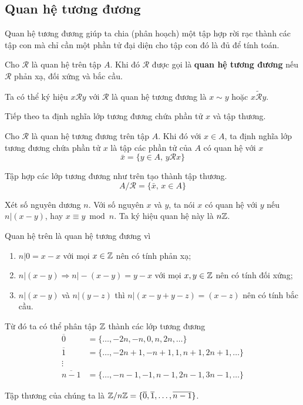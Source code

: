 \subsection*{Quan hệ tương đương}

Quan hệ tương đương giúp ta chia (phân hoạch) một tập hợp rời rạc thành các tập con mà chỉ cần một phần tử đại diện cho tập con đó là đủ để tính toán.

\begin{definition}
    Cho $\mathcal{R}$ là quan hệ trên tập $A$. Khi đó $\mathcal{R}$ được gọi là \textbf{quan hệ tương đương} nếu $\mathcal{R}$ phản xạ, đối xứng và bắc cầu.

    Ta có thể ký hiệu $x \mathcal{R} y$ với $\mathcal{R}$ là quan hệ tương đương là $x \sim y$ hoặc $x \widetilde{\mathcal{R}} y$.
\end{definition}

Tiếp theo ta định nghĩa lớp tương đương chứa phần tử $x$ và tập thương.

\begin{definition}
    Cho $\mathcal{R}$ là quan hệ tương đương trên tập $A$. Khi đó với $x \in A$, ta định nghĩa lớp tương đương chứa phần tử $x$ là tập các phần tử của $A$ có quan hệ với $x$ \[ \bar{x} = \{ y \in A, \, y \mathcal{R} x \} \]
\end{definition}

\begin{definition}
    Tập hợp các lớp tương đương như trên tạo thành tập thương.
    \[A / \mathcal{R} = \{ \bar{x}, \, x \in A \}\]
\end{definition}

\begin{example}
    Xét số nguyên dương $n$. Với số nguyên $x$ và $y$, ta nói $x$ có quan hệ với $y$ nếu $n \vert (x - y)$, hay $x \equiv y \bmod n$. Ta ký hiệu quan hệ này là $n \mathbb{Z}$.

    Quan hệ trên là quan hệ tương đương vì
    \begin{enumerate}
        \item $n \vert 0 = x - x$ với mọi $x \in \mathbb{Z}$ nên có tính phản xạ;
        \item $n \vert (x - y) \Rightarrow n \vert -(x-y) = y-x$  với mọi $x, y \in \mathbb{Z}$ nên có tính đối xứng;
        \item $n \vert (x - y)$ và $n \vert (y - z)$ thì $n \vert (x - y + y - z) = (x - z)$ nên có tính bắc cầu.
    \end{enumerate}

    Từ đó ta có thể phân tập $\mathbb{Z}$ thành các lớp tương đương
    \begin{align*}
        \overline{0} & = \{ \ldots, -2n, -n, 0, n, 2n, \ldots \} \\
        \overline{1} & = \{ \ldots, -2n+1, -n+1, 1, n+1, 2n+1, \ldots \} \\
        \vdots \\
        \overline{n-1} & = \{ \ldots, -n-1, -1, n-1, 2n-1, 3n-1, \ldots \}
    \end{align*}

    Tập thương của chúng ta là $\mathbb{Z} / n\mathbb{Z} = \{ \overline{0}, \overline{1}, \ldots, \overline{n-1} \}$.
\end{example}


